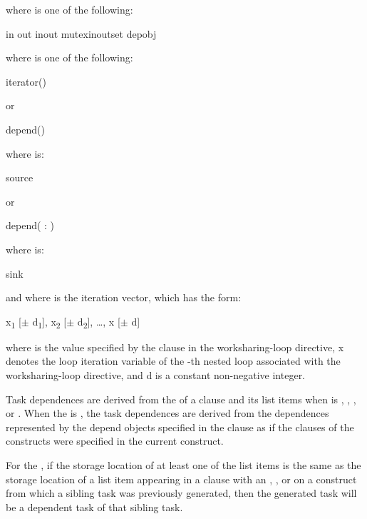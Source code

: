 where  is one of the following:
\begin{indentedcodelist}
in
out
inout
mutexinoutset
depobj
\end{indentedcodelist}

where  is one of the following:
\begin{indentedcodelist}
iterator() 
\end{indentedcodelist}

or

\begin{ompSyntax}
depend()
\end{ompSyntax}

where  is:
\begin{indentedcodelist}
source
\end{indentedcodelist}

or

\begin{ompSyntax}
depend( : )
\end{ompSyntax}

where  is:
\begin{indentedcodelist}
sink
\end{indentedcodelist}

and where  is the iteration vector, which has the form:

x\textsubscript{1} [$\pm $ d\textsubscript{1}], x\textsubscript{2} [$\pm $ d\textsubscript{2}], \ldots, x\textsubscript{} [$\pm $ d\textsubscript{}]

where  is the value specified by the  clause in the worksharing-loop
directive, x\textsubscript{} denotes the loop iteration variable of the -th
nested loop associated with the worksharing-loop directive, and d\textsubscript{} is a
constant non-negative integer.

\descr
Task dependences are derived from the  of a  clause and its list
items when  is , , , or . 
When the  is , the task dependences are 
derived from the dependences represented by the depend objects specified in the  
clause as if the  clauses of the  constructs were specified in 
the current construct. 

For the  , if the storage location of at least one
of the list items is the same as the storage location of a list item appearing
in a  clause with an , , or   on a construct
from which a sibling task was previously generated, then the generated task
will be a dependent task of that sibling task.

